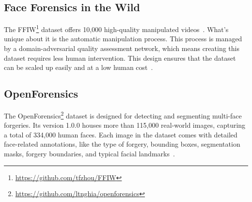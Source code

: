 \subsection{Face Forensics in the Wild}
The \ac{FFIW}\footnote{\url{https://github.com/tfzhou/FFIW}} dataset offers 10,000 high-quality
manipulated videos~\cite{Zhou_2021_CVPR}. What's unique about it is the automatic manipulation 
process. This process is managed by a domain-adversarial quality assessment network, which 
means creating this dataset requires less human intervention. This design ensures that the 
dataset can be scaled up easily and at a low human cost~\cite{Zhou_2021_CVPR}.

\subsection{OpenForensics}
The OpenForensics\footnote{\url{https://github.com/ltnghia/openforensics}} dataset is
designed for detecting and segmenting multi-face forgeries.
Its version 1.0.0 houses more than 115,000 real-world images, capturing a total of 334,000 human faces.
Each image in the dataset comes with detailed face-related annotations, like the type
of forgery, bounding boxes, segmentation masks, forgery boundaries, and typical facial
landmarks~\cite{ltnghia-ICCV2021}.


